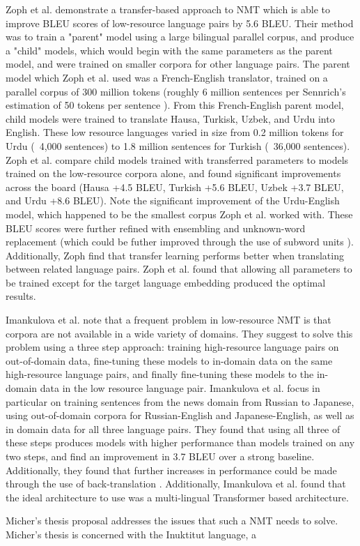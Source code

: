 \documentclass{article}
\begin{document}
Zoph et al. \cite{zoph2016transfer} demonstrate a transfer-based approach to NMT which is able to improve BLEU scores of low-resource language pairs by 5.6 BLEU. Their method was to train a "parent" model using a large bilingual parallel corpus, and produce a "child" models, which would begin with the same parameters as the parent model, and were trained on smaller corpora for other language pairs. The parent model which Zoph et al. used was a French-English translator, trained on a parallel corpus of 300 million tokens (roughly 6 million sentences per Sennrich's estimation of 50 tokens per sentence \cite{sennrich2019revisiting}). From this French-English parent model, child models were trained to translate Hausa, Turkisk, Uzbek, and Urdu into English. These low resource languages varied in size from 0.2 million tokens for Urdu (~4,000 sentences) to 1.8 million sentences for Turkish (~36,000 sentences). Zoph et al. compare child models trained with transferred parameters to models trained on the low-resource corpora alone, and found significant improvements across the board (Hausa +4.5 BLEU, Turkish +5.6 BLEU, Uzbek +3.7 BLEU, and Urdu +8.6 BLEU). Note the significant improvement of the Urdu-English model, which happened to be the smallest corpus Zoph et al. worked with. These BLEU scores were further refined with ensembling and unknown-word replacement (which could be futher improved through the use of subword units \cite{sennrich2015neural}). Additionally, Zoph find that transfer learning performs better when translating between related language pairs. Zoph et al. found that allowing all parameters to be trained except for the target language embedding produced the optimal results.

Imankulova et al. \cite{imankulova2019exploiting} note that a frequent problem in low-resource NMT is that corpora are not available in a wide variety of domains. They suggest to solve this problem using a three step approach: training high-resource language pairs on out-of-domain data, fine-tuning these models to in-domain data on the same high-resource language pairs, and finally fine-tuning these models to the in-domain data in the low resource language pair. Imankulova et al. focus in particular on training sentences from the news domain from Russian to Japanese, using out-of-domain corpora for Russian-English and Japanese-English, as well as in domain data for all three language pairs. They found that using all three of these steps produces models with higher performance than models trained on any two steps, and find an improvement in 3.7 BLEU over a strong baseline. Additionally, they found that further increases in performance could be made through the use of back-translation \cite{sennrich2015improving}. Additionally, Imankulova et al. found that the ideal architecture to use was a multi-lingual Transformer based architecture.




Micher's thesis proposal \cite{micher2018addressing} addresses the issues that such a NMT needs to solve. Micher's thesis is concerned with the Inuktitut language, a 

\nocite{*}



\end{document}
